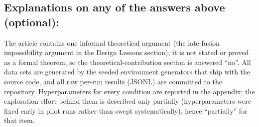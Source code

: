 \documentclass[manuscript, screen, review]{jair}
\begin{document}
\subsection*{Explanations on any of the answers above (optional):}

The article contains one informal theoretical argument (the late-fusion
impossibility argument in the Design Lessons section); it is not stated or
proved as a formal theorem, so the theoretical-contribution section is answered
``no''. All data sets are generated by the seeded environment generators that
ship with the source code, and all raw per-run results (JSONL) are committed to
the repository. Hyperparameters for every condition are reported in the
appendix; the exploration effort behind them is described only partially
(hyperparameters were fixed early in pilot runs rather than swept
systematically), hence ``partially'' for that item.
\end{document}
